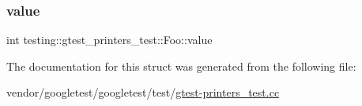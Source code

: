 \subsubsection{\texorpdfstring{value}{value}}
{\footnotesize\ttfamily int testing\+::gtest\+\_\+printers\+\_\+test\+::\+Foo\+::value}



The documentation for this struct was generated from the following file\+:\begin{DoxyCompactItemize}
\item 
vendor/googletest/googletest/test/\hyperlink{gtest-printers__test_8cc}{gtest-\/printers\+\_\+test.\+cc}\end{DoxyCompactItemize}
